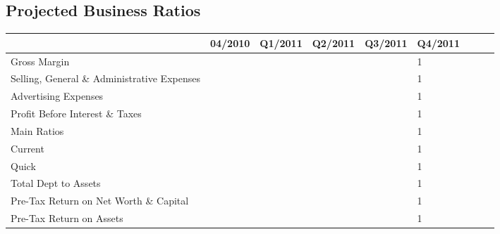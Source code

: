 \documentclass[11pt,titlepage]{article}
\begin{document}
\newpage
\thispagestyle{empty}
\begin{landscape}
\subsection{Projected Business Ratios}
\begin{scriptsize}
\begin{tabular}{ | l | l | l | l | l | l | l | l | l |}\hline
  & 04/2010 & Q1/2011 & Q2/2011 & Q3/2011 & Q4/2011\\\hline
  Gross Margin & & & & & 1\\ \hline
  Selling, General \& Administrative Expenses & & & & & 1\\\hline
  Advertising Expenses & & & & & 1\\ \hline
  Profit Before Interest \& Taxes & & & & & 1\\\hline
  Main Ratios & & & & & 1\\ \hline
  Current & & & & & 1\\\hline
  Quick & & & & & 1\\ \hline
  Total Dept to Assets & & & & & 1\\\hline
  Pre-Tax Return on Net Worth \& Capital & & & & & 1\\ \hline
  Pre-Tax Return on Assets & & & & & 1\\\hline

\end{tabular}
\end{scriptsize}
\end{landscape}
\end{document}
